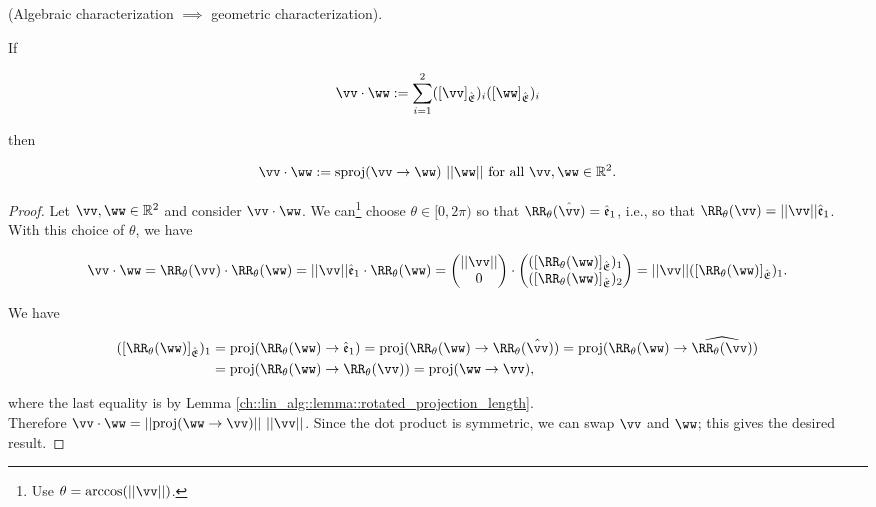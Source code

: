 \begin{deriv}
    (Algebraic characterization $\implies$ geometric characterization).
    
    If

    \begin{align*}
        \vv \cdot \ww := \sum_{i = 1}^2 ([\vv]_\sE)_i ([\ww]_\sE)_i
    \end{align*}

    then
    
    \begin{align*}
        \vv \cdot \ww := \sproj(\vv \rightarrow \ww) \spc ||\ww|| \text{ for all $\vv, \ww \in \R^2$}.
    \end{align*}
\end{deriv}

\begin{proof}
    Let $\vv, \ww \in \R^2$ and consider $\vv \cdot \ww$. We can\footnote{Use $\theta = \arccos(||\vv||)$.} choose $\theta \in [0, 2\pi)$ so that $\RR_\theta(\hvv) = \see_1$, i.e., so that $\RR_\theta(\vv) = ||\vv||\see_1$. With this choice of $\theta$, we have
    
    \begin{align*}
        \vv \cdot \ww 
        = \RR_\theta(\vv) \cdot \RR_\theta(\ww) 
        = ||\vv|| \see_1 \cdot \RR_\theta(\ww)
        = 
        \begin{pmatrix} ||\vv|| \\ 0 \end{pmatrix}
        \cdot 
        \begin{pmatrix} ([\RR_\theta(\ww)]_\sE)_1 \\ ([\RR_\theta(\ww)]_\sE)_2 \end{pmatrix} 
        = 
        ||\vv|| ([\RR_\theta(\ww)]_\sE)_1.
    \end{align*}
    
    We have
    
    \begin{align*}
        ([\RR_\theta(\ww)]_\sE)_1
        &= \proj(\RR_\theta(\ww) \rightarrow \see_1) 
        = \proj(\RR_\theta(\ww) \rightarrow \RR_\theta(\hvv))
        = \proj(\RR_\theta(\ww) \rightarrow \widehat{\RR_\theta(\vv)}) \\
        &= \proj(\RR_\theta(\ww) \rightarrow \RR_\theta(\vv)) 
        = \proj(\ww \rightarrow \vv),
    \end{align*}
    
    where the last equality is by Lemma \ref{ch::lin_alg::lemma::rotated_projection_length}. \\ Therefore $\vv \cdot \ww = ||\proj(\ww \rightarrow \vv)|| \spc ||\vv||$. Since the dot product is symmetric, we can swap $\vv$ and $\ww$; this gives the desired result.
\end{proof}


